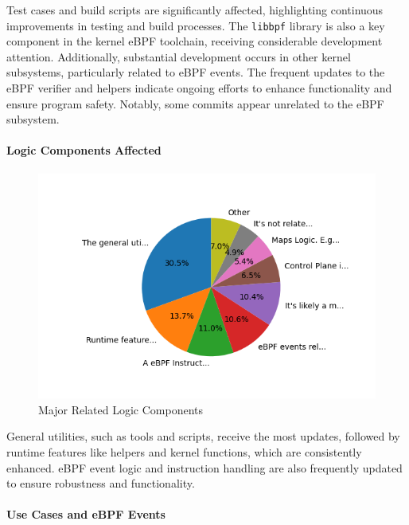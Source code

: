 Test cases and build scripts are significantly affected, highlighting continuous improvements in testing and build processes. The \texttt{libbpf} library is also a key component in the kernel eBPF toolchain, receiving considerable development attention. Additionally, substantial development occurs in other kernel subsystems, particularly related to eBPF events. The frequent updates to the eBPF verifier and helpers indicate ongoing efforts to enhance functionality and ensure program safety. Notably, some commits appear unrelated to the eBPF subsystem.

\paragraph{Logic Components Affected}

\begin{figure}[ht]
    \centering
    \includegraphics[width=\linewidth]{feature-analysis/commit_pie_chart_major_logic_component.png}
    \caption{Major Related Logic Components}
    \label{fig:commit_pie_chart_major_logic_component}
\end{figure}

General utilities, such as tools and scripts, receive the most updates, followed by runtime features like helpers and kernel functions, which are consistently enhanced. eBPF event logic and instruction handling are also frequently updated to ensure robustness and functionality.

\paragraph{Use Cases and eBPF Events}


